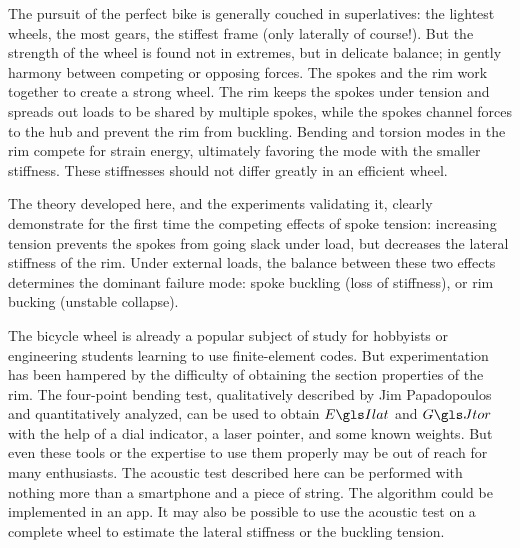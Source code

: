 \documentclass[\rootdir/thesis.tex]{subfiles}
\begin{document}

The pursuit of the perfect bike is generally couched in superlatives: the lightest wheels, the most gears, the stiffest frame (only laterally of course!). But the strength of the wheel is found not in extremes, but in delicate balance; in gently harmony between competing or opposing forces. The spokes and the rim work together to create a strong wheel. The rim keeps the spokes under tension and spreads out loads to be shared by multiple spokes, while the spokes channel forces to the hub and prevent the rim from buckling. Bending and torsion modes in the rim compete for strain energy, ultimately favoring the mode with the smaller stiffness. These stiffnesses should not differ greatly in an efficient wheel.

The theory developed here, and the experiments validating it, clearly demonstrate for the first time the competing effects of spoke tension: increasing tension prevents the spokes from going slack under load, but decreases the lateral stiffness of the rim. Under external loads, the balance between these two effects determines the dominant failure mode: spoke buckling (loss of stiffness), or rim bucking (unstable collapse).

The bicycle wheel is already a popular subject of study for hobbyists or engineering students learning to use finite-element codes. But experimentation has been hampered by the difficulty of obtaining the section properties of the rim. The four-point bending test, qualitatively described by Jim Papadopoulos and quantitatively analyzed, can be used to obtain $\EIl$ and $\GJ$ with the help of a dial indicator, a laser pointer, and some known weights. But even these tools or the expertise to use them properly may be out of reach for many enthusiasts. The acoustic test described here can be performed with nothing more than a smartphone and a piece of string. The algorithm could be implemented in an app. It may also be possible to use the acoustic test on a complete wheel to estimate the lateral stiffness or the buckling tension.

\end{document}
